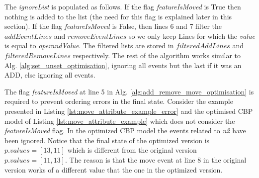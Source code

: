 \documentclass{llncs}
\begin{document}
The \emph{ignoreList} is populated as follows.
If the flag \emph{featureIsMoved} is True then nothing is added to the list (the need for this flag is explained later in this section).
If the flag \emph{featureIsMoved} is False, then lines 6 and 7 filter the $addEventLines$ and $removeEventLines$ so we only keep Lines for which the \emph{value} is equal to \emph{operandValue}.
The filtered lists are stored in $filteredAddLines$ and $filteredRemoveLines$ respectively.
The rest of the algorithm works similar to Alg. \ref{alg:set_unset_optimisation}, ignoring all events but the last if it was an ADD, else ignoring all events. 


The flag \emph{featureIsMoved} at line 5 in Alg. \ref{alg:add_remove_move_optimisation} is required to prevent ordering errors in the final state.
Consider the example presented in Listing \ref{lst:move_attribute_example_error} and the optimised CBP model of Listing \ref{lst:move_attribute_example} which does not consider the \emph{featureIsMoved} flag.
In the optimized CBP model the events related to \emph{n2} have been ignored.
Notice that the final state of the optimized version is $p.values = [13, 11]$  which is different from the original version $p.values = [11,13]$.
The reason is that the move event at line 8 in the original version works of a different value that the one in the optimized version.
\end{document}
